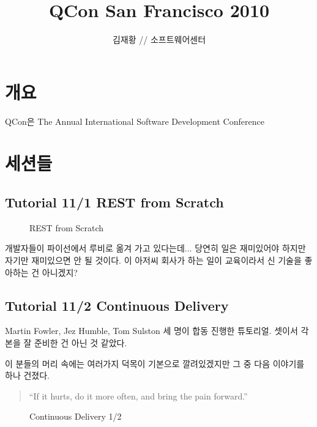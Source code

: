 \documentclass[a4paper]{article}
\title{QCon San Francisco 2010}
\author{김재황 // 소프트웨어센터}
\begin{document}
\maketitle

\section{개요}

QCon은 
The Annual International Software Development Conference

\section{세션들}

\subsection{Tutorial 11/1 REST from Scratch}

\begin{figure}[t]
    \begin{Frame}
        \begin{center}
        \end{center}
    \end{Frame}
    \caption{REST from Scratch}
    \label{REST}
\end{figure}

개발자들이 파이선에서 루비로 옮겨 가고 있다는데... 당연히 일은
재미있어야 하지만 자기만 재미있으면 안 될 것이다. 이 아저씨 회사가 하는
일이 교육이라서 신 기술을 좋아하는 건 아니겠지?

\subsection{Tutorial 11/2 Continuous Delivery}

Martin Fowler, Jez Humble, Tom Sulston 세 명이 합동 진행한 튜토리얼.
셋이서 각본을 잘 준비한 건 아닌 것 같았다.

이 분들의 머리 속에는 여러가지 덕목이 기본으로 깔려있겠지만 그 중 다음
이야기를 하나 건졌다.

\begin{quote}
``If it hurts, do it more often, and bring the pain forward.''  
\end{quote}

\begin{figure}[t]
    \begin{Frame}
        \begin{center}
        \end{center}
    \end{Frame}
    \caption{Continuous Delivery 1/2}
    \label{Continuous Delivery 1}
\end{figure}
\end{document}
